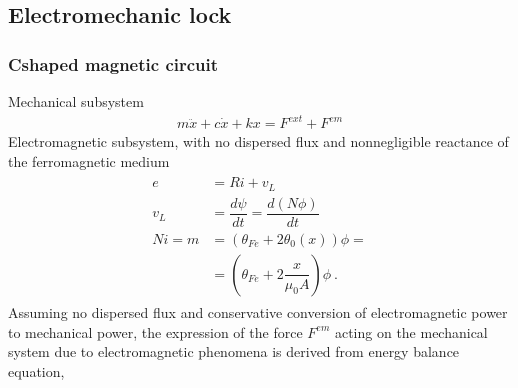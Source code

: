 \documentclass[letterpaper,10pt,english]{jupyterBook}
\begin{document}
\sphinxstepscope


\subsection{Electromechanic lock}
\label{\detokenize{ch/systems-electromechanic-lock:electromechanic-lock}}\label{\detokenize{ch/systems-electromechanic-lock:classical-electromagnetism-systems-electromechanic-examples-lock}}\label{\detokenize{ch/systems-electromechanic-lock::doc}}

\subsubsection{C\sphinxhyphen{}shaped magnetic circuit}
\label{\detokenize{ch/systems-electromechanic-lock:c-shaped-magnetic-circuit}}
\sphinxAtStartPar
Mechanical sub\sphinxhyphen{}system
\begin{equation*}
\begin{split}m \ddot{x} + c \dot{x} + k x = F^{ext} + F^{em}\end{split}
\end{equation*}
\sphinxAtStartPar
Electromagnetic sub\sphinxhyphen{}system, with no dispersed flux and non\sphinxhyphen{}negligible reactance of the ferromagnetic medium
\begin{equation*}
\begin{split}\begin{aligned}
  e   & = R i + v_L \\
  v_L & = \dfrac{d \psi}{dt} = \dfrac{d \left( N \phi \right)}{d t} \\
  N i = m & = \left( \theta_{Fe} + 2 \theta_0(x) \right) \phi = \\
          & = \left( \theta_{Fe} + 2 \dfrac{x}{\mu_0 A} \right) \phi \ .
\end{aligned}\end{split}
\end{equation*}
\sphinxAtStartPar
Assuming no dispersed flux and conservative conversion of electromagnetic power to mechanical power, the expression of the force \(F^{em}\) acting on the mechanical system due to electromagnetic phenomena is derived from energy balance equation,
\end{document}

